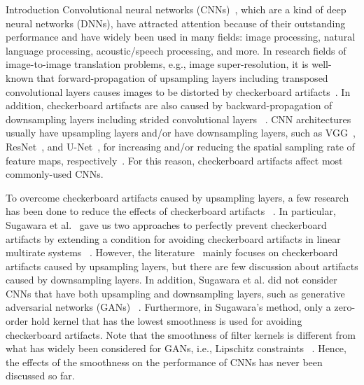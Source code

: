 \documentclass{article}
\makeatletter
\renewcommand\section{\@startsection{section}{1}{\z@}
                      {0.5ex \@plus 0ex \@minus -2ex}
                      {0.5ex \@plus 0ex}
                      {\normalfont\Large\bfseries}}
\makeatother
\begin{document}
\section{Introduction}
  Convolutional neural networks (CNNs)~\cite{lecun1989generalization, krizhevsky2012imagenet},
  which are a kind of deep neural networks (DNNs),
  have attracted attention because of their outstanding performance
  and have widely been used in many fields: image processing, natural language processing,
  acoustic/speech processing, and more.
  In research fields of image-to-image translation problems,
  e.g., image super-resolution,
  it is well-known that forward-propagation of upsampling layers
  including transposed convolutional layers
  causes images to be distorted by checkerboard artifacts~\cite{odena2016deconvolution}.
  In addition, checkerboard artifacts are also caused
  by backward-propagation of downsampling layers including strided convolutional layers
  ~\cite{odena2016deconvolution}.
  CNN architectures usually have upsampling layers and/or have downsampling layers,
  such as VGG~\cite{simonyan2014very}, ResNet~\cite{he2016deep},
  and U-Net~\cite{ronneberger2015unet},
  for increasing and/or reducing the spatial sampling rate of feature maps,
  respectively~\cite{goodfellow2016deep}.
  For this reason,
  checkerboard artifacts affect most commonly-used CNNs.

  To overcome checkerboard artifacts caused by upsampling layers,
  a few research has been done to reduce the effects of checkerboard artifacts
  ~\cite{johnson2016perceptual, aitken2017checkerboard,
  odena2016deconvolution, gao2017pixel, wojna2017devil, sugawara2018super, sugawara2019checkerboard}.
  In particular, 
  Sugawara et al.~\cite{sugawara2018super, sugawara2019checkerboard}
  gave us two approaches to perfectly prevent checkerboard artifacts
  by extending a condition for avoiding checkerboard artifacts
  in linear multirate systems
  ~\cite{harada1998multidimensional, tamura1998design, harada1998multidimensional_trans,
  iwai2010methods}.
  However, the literature~\cite{sugawara2018super, sugawara2019checkerboard}
  mainly focuses on checkerboard artifacts caused by upsampling layers,
  but there are few discussion about artifacts caused by downsampling layers.
  In addition, Sugawara et al. did not consider CNNs that have both
  upsampling and downsampling layers, such as generative adversarial networks (GANs)
  ~\cite{goodfellow2014generative}.
  Furthermore, in Sugawara's method,
  only a zero-order hold kernel that has the lowest smoothness
  is used for avoiding checkerboard artifacts.
  Note that the smoothness of filter kernels is different from
  what has widely been considered for GANs,
  i.e., Lipschitz constraints
  ~\cite{arjovsky2017wasserstein, gulrajani2017improved, miyato2018spectral}.
  Hence, the effects of the smoothness on the performance of CNNs
  has never been discussed so far.
  
\end{document}

